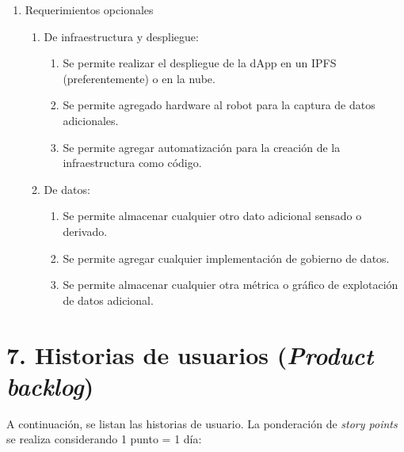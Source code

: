 \documentclass[
11pt, %
]{charter}
\begin{document}
\begin{enumerate}
	\item Requerimientos opcionales		
		\begin{enumerate}			
			\item De infraestructura y despliegue:
				\begin{enumerate}			
					\item Se permite realizar el despliegue de la dApp en un IPFS (preferentemente) o en la nube.					
					\item Se permite agregado hardware al robot para la captura de datos adicionales.
					\item Se permite agregar automatización para la creación de la infraestructura como código.
				\end{enumerate}			
			
			\item De datos:
				\begin{enumerate}			
					\item Se permite almacenar cualquier otro dato adicional sensado o derivado.
					\item Se permite agregar cualquier implementación de gobierno de datos.	
					\item Se permite almacenar cualquier otra métrica o gráfico de explotación de datos adicional.
				\end{enumerate}
		
	\end{enumerate}
\end{enumerate}


\section{7. Historias de usuarios (\textit{Product backlog})}
\label{sec:backlog}

A continuación, se listan las historias de usuario. La ponderación de \textit{story points} se realiza considerando 1 punto = 1 día:
\end{document}
